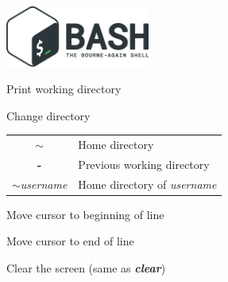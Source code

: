 \documentclass[12pt, a4paper]
{article}
\begin{document}
	\pagestyle{empty}
	
	\begin{center}
		 \hspace{1em}  \includegraphics[height=2cm]{bash_the_bourne_again_shell}
	\end{center}
	
	
	\begin{multicols}{3}
		
		
		\begin{description}[nolistsep]
			\item[pwd] Print working directory
			\item[cd] Change directory 
			\item
			\begin{tabular}{cl}
				{\large \ttfamily \textbf{$\sim$}} & Home directory \\
				{\large \ttfamily \textbf{-}} & Previous working directory \\
				{\large \ttfamily \textbf{$\sim$}\textit{username}} & Home directory of \textit{username}
			\end{tabular}
			\item[ctrl-A] Move cursor to beginning of line
			\item[ctrl-E] Move cursor to end of line
			\item[ctrl-L] Clear the screen (same as \textbf{\textit{clear}})
		\end{description}
		
		

\end{multicols}
\end{document}
